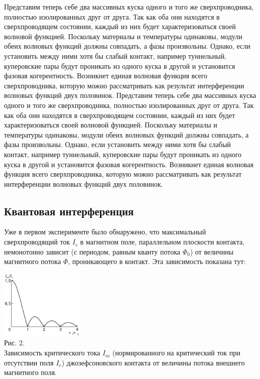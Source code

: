 \documentclass[a4paper,14pt]{article}
\begin{document}
Представим теперь себе два массивных куска одного и того же сверхпроводника, полностью изолированных друг от друга. Так как оба они находятся в сверхпроводящем состоянии, каждый из них будет характеризоваться своей волновой функцией. Поскольку материалы и температуры одинаковы, модули обеих волновых функций должны совпадать, а фазы произвольны. Однако, если установить между ними хотя бы слабый контакт, например туннельный, куперовские пары будут проникать из одного куска в другой и установится фазовая когерентность. Возникнет единая волновая функция всего сверхпроводника, которую можно рассматривать как результат интерференции волновых функций двух половинок.
Представим теперь себе два массивных куска одного и того же сверхпроводника, полностью изолированных друг от друга. Так как оба они находятся в сверхпроводящем состоянии, каждый из них будет характеризоваться своей волновой функцией. Поскольку материалы и температуры одинаковы, модули обеих волновых функций должны совпадать, а фазы произвольны. Однако, если установить между ними хотя бы слабый контакт, например туннельный, куперовские пары будут проникать из одного куска в другой и установится фазовая когерентность. Возникнет единая волновая функция всего сверхпроводника, которую можно рассматривать как результат интерференции волновых функций двух половинок.
\subsection*{Квантовая интерференция}

Уже в первом эксперименте было обнаружено, что максимальный сверхпроводящий ток $I_c$ в магнитном поле, параллельном плоскости контакта, немонотонно зависит (с периодом, равным кванту потока $\Phi_0$) от величины магнитного потока $\Phi$, проникающего в контакт. Эта зависимость показана тут:

\begin{center}
	\includegraphics[width=0.3\textwidth]{4_9_1}\\
	Рис. 2.\\
	Зависимость критического тока $I_m$ (нормированного на критический ток при отсутствии поля $I_c$) джозефсоновского контакта от величины потока внешнего магнитного поля.
\end{center}
\end{document}
